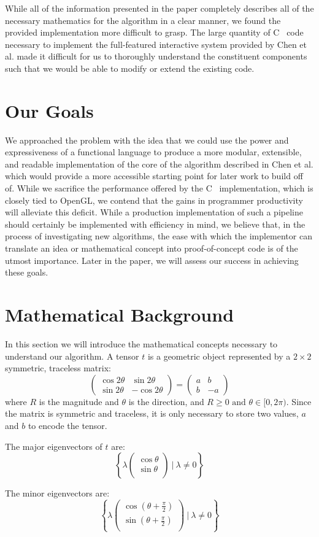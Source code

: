 \documentclass[twocolumn]{article}
\newcommand{\sqmat}[4]{\ensuremath{
    \left(\begin{array}{cc}
        #1 & #2 \\
        #3 & #4
    \end{array}\right)}}
\newcommand{\mkvec}[2]{\ensuremath{
    \left(\begin{array}{c}
        #1 \\
        #2 \\
    \end{array}\right)}}
\def \cpp {C\nolinebreak[4]\hspace{-.05em}\raisebox{.4ex}{\tiny\bf ++}~}
\begin{document}
While all of the information presented in the paper completely describes all of
the necessary mathematics for the algorithm in a clear manner, we found the
provided implementation more difficult to grasp. The large quantity of \cpp
code necessary to implement the full-featured interactive system provided by
Chen et al. made it difficult for us to thoroughly understand the constituent
components such that we would be able to modify or extend the existing code.

\section{Our Goals}
We approached the problem with the idea that we could use the power and
expressiveness of a functional language to produce a more modular, extensible,
and readable implementation of the core of the algorithm described in Chen et
al. which would provide a more accessible starting point for later work to
build off of. While we sacrifice the performance offered by the \cpp
implementation, which is closely tied to OpenGL, we contend that the gains in
programmer productivity will alleviate this deficit. While a production
implementation of such a pipeline should certainly be implemented with
efficiency in mind, we believe that, in the process of investigating new
algorithms, the ease with which the implementor can translate an idea or
mathematical concept into proof-of-concept code is of the utmost importance.
Later in the paper, we will assess our success in achieving these goals.

\section{Mathematical Background}\label{sec:math}
In this section we will introduce the mathematical concepts necessary to
understand our algorithm. A tensor $t$ is a geometric object represented by a
$2\times2$ symmetric, traceless matrix:
\[
    \sqmat{\cos{2\theta}}{\sin{2\theta}}{\sin{2\theta}}{-\cos{2\theta}}
    = \sqmat{a}{b}{b}{-a}
\]
where $R$ is the magnitude and $\theta$ is the direction, and
$R\geq0 \textrm{ and } \theta\in[0,2\pi)$. Since the matrix is symmetric and
traceless, it is only necessary to store two values, $a$ and $b$ to encode
the tensor.

The major eigenvectors of $t$ are:
\[
    \left\{
        \lambda\mkvec{\cos{\theta}}{\sin{\theta}} ~|~ \lambda \neq 0
    \right\}
\]

The minor eigenvectors are:
\[
    \left\{
        \lambda\mkvec
                {\cos{(\theta+\frac{\pi}{2})}}
                {\sin{(\theta+\frac{\pi}{2})}}
        ~|~ \lambda \neq 0
    \right\}
\]
\end{document}
